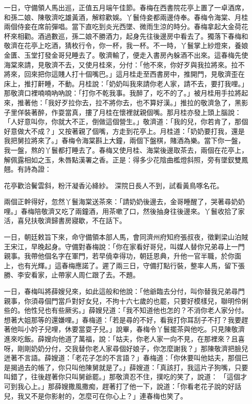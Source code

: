 一日，守備領人馬出巡，正值五月端午佳節。春梅在西書院花亭上置了一卓酒席，和孫二娘、陳敬濟吃雄黃酒，解粽歡娛。丫鬟侍妾都兩邊侍奉。春梅令海棠、月桂兩個侍妾在席前彈唱。當下直吃到炎光西墜、微雨生涼的時分。春梅拿起大金荷花杯來相勸。酒過數巡，孫二娘不勝酒力，起身先往後邊房中看去了。獨落下春梅和敬濟在花亭上吃酒，猜枚行令，你一杯，我一杯。不一時，丫鬟掌上紗燈來，養娘金匱、玉堂打發金哥兒睡去了。敬濟輸了，便走入書房內躲酒不出來。這春梅先使海棠來請，見敬濟不去，又使月桂來，分付：「他不來，你好歹與我拉將來。拉不將來，回來把你這賤人打十個嘴巴。」這月桂走至西書房中，推開門，見敬濟歪在床上，推打鼾睡，不動。月桂說：「奶奶叫我來請你老人家，請不去，要打我哩。」那敬濟口裡喃喃吶吶說：「打你不乾我事。我醉了，吃不的了。」被月桂用手拉將起來，推著他：「我好歹拉你去，拉不將你去，也不算好漢。」推拉的敬濟急了，黑影子里佯裝著醉，作耍當真，摟了月桂在懷裡就親個嘴。那月桂亦發上頭上腦說：「人好意叫你，你就大不正，倒做這個營生。」敬濟道：「我的兒，你若肯了，那個好意做大不成？」又按著親了個嘴，方走到花亭上。月桂道：「奶奶要打我，還是我把舅拉將來了。」春梅令海棠斟上大鐘，兩個下盤棋，賭酒為樂。當下你一盤，我一盤，熬的丫鬟都打睡去了。春梅又使月桂、海棠後邊取茶去，兩個在花亭上，解佩露相如之玉，朱唇點漢署之香。正是：得多少花陰曲檻燈斜照，旁有墜釵雙鳳翹。有詩為證：

花亭歡洽鬢雲斜，粉汗凝香沁絳紗。
深院日長人不到，試看黃鳥啄名花。

兩個正幹得好，忽然丫鬟海棠送茶來：「請奶奶後邊去，金哥睡醒了，哭著尋奶奶哩。」春梅陪敬濟又吃了兩鐘酒，用茶嗽了口，然後抽身往後邊來。丫鬟收拾了家活，喜兒扶敬濟歸書房寢歇，不在話下。

一日，朝廷敕旨下來，命守備領本部人馬，會同濟州府知府張叔夜，徵剿梁山泊賊王宋江，早晚起身。守備對春梅說：「你在家看好哥兒，叫媒人替你兄弟尋上一門親事。我帶他個名字在軍門，若早僥幸得功，朝廷恩典，升他一官半職，於你面上，也有光輝。」這春梅應諾了。遲了兩三日，守備打點行裝，整率人馬，留下張勝、李安看家，止帶家人周仁跟了去。不題。

一日，春梅叫將薛嫂兒來，如此這般和他說：「他爺臨去分付，叫你替我兄弟尋門親事，你須尋個門當戶對好女兒，不拘十六七歲的也罷，只要好模樣兒，聯明伶俐些的。他性兒也有些厥劣。」薛嫂兒道：「我不知道他也怎的？不消你老人家分付。想著大姐那等的還嫌哩。」春梅道：「若是尋的不好，看我打你耳刮子不打？我要趕著他叫小妗子兒哩，休要當耍子兒。」說畢，春梅令丫鬟擺茶與他吃。只見陳敬濟進來吃飯。薛嫂向他道了萬福，說：「姑夫，你老人家一向不見，在那裡來？且喜呀，剛剛奶奶分付，交我替你老人家尋個好娘子，你怎麼謝我？」那陳敬濟把臉兒迸著不言語。薛嫂道：「老花子怎的不言語？」春梅道：「你休要叫他姑夫，那個已是揭過去的帳了，你只叫他陳舅就是了。」薛嫂道：「真該打，我這片子狗嘴，只要叫錯了，往後趕著你只叫舅爺罷。」那敬濟忍不住，撲吃的笑了，說道： 「這個才可到我心上。」那薛嫂撒風撒痴，趕著打了他一下，說道：「你看老花子說的好話兒，我又不是你影射的，怎麼可在你心上？」連春梅也笑了。


